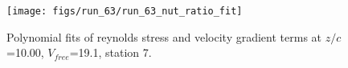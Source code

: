 \begin{figure}[H]
\centering
\texttt{[image: figs/run\_63/run\_63\_nut\_ratio\_fit]}
\caption{Polynomial fits of reynolds stress and velocity gradient terms at $z/c$=10.00, $V_{free}$=19.1, station 7.}
\label{fig:run_63_nut_ratio_fit}
\end{figure}


